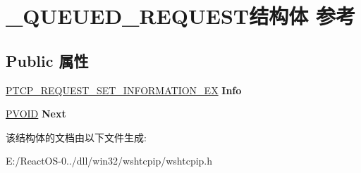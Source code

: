 \hypertarget{struct___q_u_e_u_e_d___r_e_q_u_e_s_t}{}\section{\+\_\+\+Q\+U\+E\+U\+E\+D\+\_\+\+R\+E\+Q\+U\+E\+S\+T结构体 参考}
\label{struct___q_u_e_u_e_d___r_e_q_u_e_s_t}
\subsection*{Public 属性}
\begin{DoxyCompactItemize}
\item 
\mbox{\label{struct___q_u_e_u_e_d___r_e_q_u_e_s_t_abfbf3d56d4fe16277ac37dcad7075217}} 
\hyperlink{struct___t_c_p___r_e_q_u_e_s_t___s_e_t___i_n_f_o_r_m_a_t_i_o_n___e_x}{P\+T\+C\+P\+\_\+\+R\+E\+Q\+U\+E\+S\+T\+\_\+\+S\+E\+T\+\_\+\+I\+N\+F\+O\+R\+M\+A\+T\+I\+O\+N\+\_\+\+EX} {\bfseries Info}
\item 
\mbox{\label{struct___q_u_e_u_e_d___r_e_q_u_e_s_t_aaa68bfa43570207f4b07724342683a5c}} 
\hyperlink{interfacevoid}{P\+V\+O\+ID} {\bfseries Next}
\end{DoxyCompactItemize}


该结构体的文档由以下文件生成\+:\begin{DoxyCompactItemize}
\item 
E\+:/\+React\+O\+S-\/0../dll/win32/wshtcpip/wshtcpip.\+h\end{DoxyCompactItemize}
